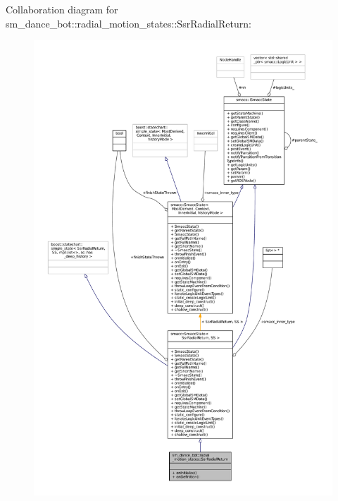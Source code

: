 Collaboration diagram for sm\+\_\+dance\+\_\+bot\+:\+:radial\+\_\+motion\+\_\+states\+:\+:Ssr\+Radial\+Return\+:
\nopagebreak
\begin{figure}[H]
\begin{center}
\leavevmode
\includegraphics[width=350pt]{structsm__dance__bot_1_1radial__motion__states_1_1SsrRadialReturn__coll__graph}
\end{center}
\end{figure}
